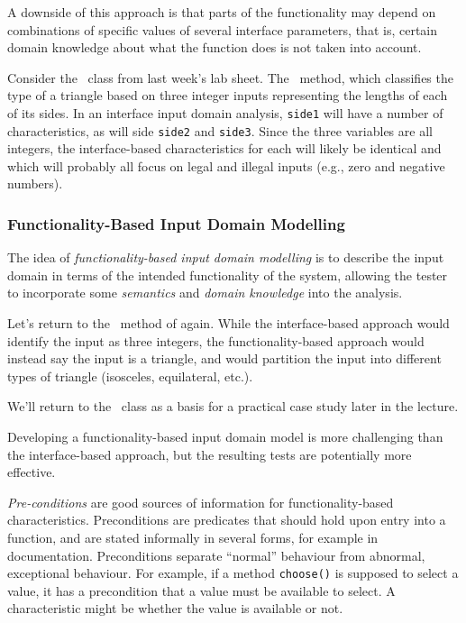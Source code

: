 A downside of this approach is that parts of the functionality may depend
on combinations of specific values of several interface parameters, that is,
certain domain knowledge about what the function does is not taken into account.

Consider the \triangleclass~class from last week's lab sheet. The
\classifymethod~method, which classifies the type of a triangle based on three
integer inputs representing the lengths of each of its sides. In an interface
input domain analysis, {\tt side1} will have a number of characteristics, as
will side {\tt side2} and {\tt side3}. Since the three variables are all
integers, the interface-based characteristics for each will likely be identical
and which will probably all focus on legal and illegal inputs (e.g., zero and
negative numbers).

\subsubsection*{Functionality-Based Input Domain Modelling}

The idea of {\it functionality-based input domain modelling} is to describe the
input domain in terms of the intended functionality of the system, allowing the
tester to incorporate some {\it semantics} and {\it domain knowledge} into the
analysis. 

Let's return to the \classifymethod~method of \triangleclass again. While the
interface-based approach would identify the input as three integers, the
functionality-based approach would instead say the input is a triangle, and
would partition the input into different types of triangle (isosceles,
equilateral, etc.). 

We'll return to the \triangleclass~class as a basis for a practical case study
later in the lecture. 

Developing a functionality-based input domain model is more challenging than the
interface-based approach, but the resulting tests are potentially more effective.

{\it Pre-conditions} are good sources of information for functionality-based
characteristics. Preconditions are predicates that should hold upon entry into a
function, and are stated informally in several forms, for example in documentation.
Preconditions separate ``normal'' behaviour from abnormal, exceptional
behaviour. For example, if a method {\tt choose()} is supposed to select a
value, it has a precondition that a value must be available to select. A
characteristic might be whether the value is available or not.


